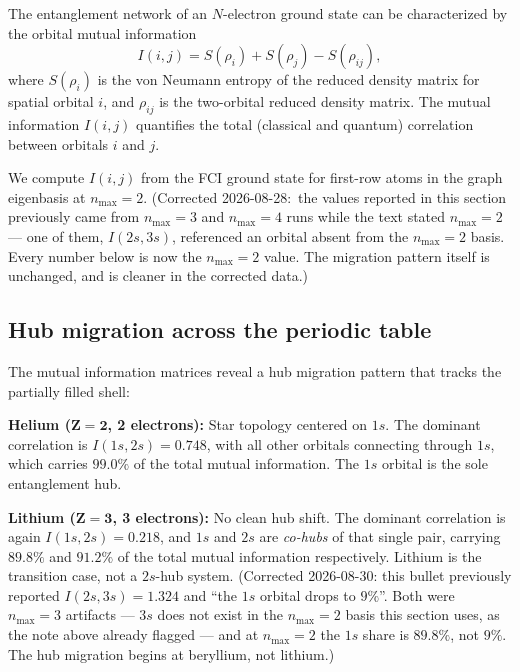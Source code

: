 \documentclass[twocolumn,pra,amsmath,amssymb,superscriptaddress]{revtex4-2}
\begin{document}
The entanglement network of an $N$-electron ground state can be
characterized by the orbital mutual information~\cite{Rissler2006,
Boguslawski2012}
\begin{equation}
  I(i, j) = S(\rho_i) + S(\rho_j) - S(\rho_{ij}),
  \label{eq:mi}
\end{equation}
where $S(\rho_i)$ is the von Neumann entropy of the reduced
density matrix for spatial orbital $i$, and $\rho_{ij}$ is the
two-orbital reduced density matrix.  The mutual information
$I(i, j)$ quantifies the total (classical and quantum) correlation
between orbitals $i$ and $j$.

We compute $I(i, j)$ from the FCI ground state for first-row atoms
in the graph eigenbasis at $n_{\max} = 2$.  (Corrected 2026-08-28:\
the values reported in this section previously came from
$n_{\max} = 3$ and $n_{\max} = 4$ runs while the text stated
$n_{\max} = 2$ --- one of them, $I(2s, 3s)$, referenced an orbital
absent from the $n_{\max} = 2$ basis.  Every number below is now the
$n_{\max} = 2$ value.  The migration pattern itself is unchanged, and
is cleaner in the corrected data.)

\subsection{Hub migration across the periodic table}

The mutual information matrices reveal a hub migration pattern
that tracks the partially filled shell:

\medskip\noindent\textbf{Helium ($\mathbf{Z = 2}$, 2 electrons):}
Star topology centered on $1s$.  The dominant correlation is
$I(1s, 2s) = 0.748$, with all other orbitals connecting through
$1s$, which carries $99.0\%$ of the total mutual information.  The
$1s$ orbital is the sole entanglement hub.

\medskip\noindent\textbf{Lithium ($\mathbf{Z = 3}$, 3 electrons):}
No clean hub shift.  The dominant correlation is again
$I(1s, 2s) = 0.218$, and $1s$ and $2s$ are \emph{co-hubs} of that
single pair, carrying $89.8\%$ and $91.2\%$ of the total mutual
information respectively.  Lithium is the transition case, not a
$2s$-hub system.  (Corrected 2026-08-30: this bullet previously
reported $I(2s, 3s) = 1.324$ and ``the $1s$ orbital drops to $9\%$''.
Both were $n_{\max} = 3$ artifacts --- $3s$ does not exist in the
$n_{\max} = 2$ basis this section uses, as the note above already
flagged --- and at $n_{\max} = 2$ the $1s$ share is $89.8\%$, not
$9\%$.  The hub migration begins at beryllium, not lithium.)
\end{document}
